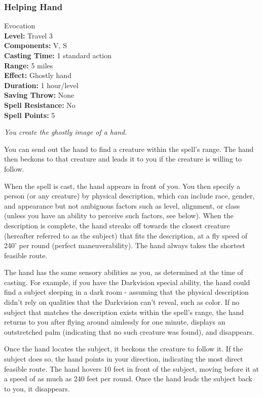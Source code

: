 \subsubsection{Helping Hand}
\label{Spell:HelpingHand}
Evocation
\\ \textbf{Level:} Travel 3
\\ \textbf{Components:} V, S
\\ \textbf{Casting Time:} 1 standard action
\\ \textbf{Range:} 5 miles
\\ \textbf{Effect:} Ghostly hand
\\ \textbf{Duration:} 1 hour/level
\\ \textbf{Saving Throw:} None
\\ \textbf{Spell Resistance:} No
\\ \textbf{Spell Points:} 5

\emph{You create the ghostly image of a hand.}

You can send out the hand to find a creature within the spell's range. 
The hand then beckons to that creature and leads it to you if the creature is willing to follow.

When the spell is cast, the hand appears in front of you. 
You then specify a person (or any creature) by physical description, which can include race, gender, and appearance but not ambiguous factors such as level, alignment, or class (unless you have an ability to perceive such factors, see below).
When the description is complete, the hand streaks off towards the closest creature (hereafter referred to as the subject) that fits the description, at a fly speed of 240' per round (perfect maneuverability). The hand always takes the shortest feasible route.

The hand has the same sensory abilities as you, as determined at the time of casting. For example, if you have the Darkvision special ability, the hand could find a subject sleeping in a dark room - assuming that the physical description didn't rely on qualities that the Darkvision can't reveal, such as color. If no subject that matches the description exists within the spell's range, the hand returns to you after flying around aimlessly for one minute, displays an outstretched palm (indicating that no such creature was found), and disappears.

Once the hand locates the subject, it beckons the creature to follow it. 
If the subject does so, the hand points in your direction, indicating the most direct feasible route. 
The hand hovers 10 feet in front of the subject, moving before it at a speed of as much as 240 feet per round. 
Once the hand leads the subject back to you, it disappears.

